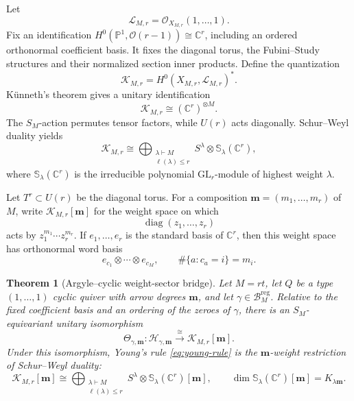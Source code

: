 \documentclass[11pt]{article}
\newtheorem{theorem}{Theorem}[section]
\theoremstyle{definition}
\theoremstyle{remark}
\newcommand{\C}{\mathbb C}
\newcommand{\Pp}{\mathbb P}
\newcommand{\cH}{\mathcal H}
\newcommand{\cK}{\mathcal K}
\newcommand{\cB}{\mathcal B}
\newcommand{\cO}{\mathcal O}
\newcommand{\diag}{\operatorname{diag}}
\newcommand{\reg}{\mathrm{reg}}
\begin{document}
Let
\begin{equation}\label{eq:master-polarization}
 \mathscr L_{M,r}=\cO_{X_{M,r}}(1,\ldots,1).
\end{equation}
Fix an identification $H^0(\Pp^1,\cO(r-1))\cong\C^r$, including an ordered orthonormal coefficient basis.  It fixes the diagonal torus, the Fubini--Study structures and their normalized section inner products.  Define the quantization
\begin{equation}\label{eq:master-Hilbert}
 \cK_{M,r}=H^0(X_{M,r},\mathscr L_{M,r})^*.
\end{equation}
K\"unneth's theorem gives a unitary identification
\begin{equation}\label{eq:master-tensor}
 \cK_{M,r}\cong(\C^r)^{\otimes M}.
\end{equation}
The $S_M$-action permutes tensor factors, while $U(r)$ acts diagonally.  Schur--Weyl duality \cite{FultonHarris1991} yields
\begin{equation}\label{eq:schur-weyl}
 \cK_{M,r}
 \cong
 \bigoplus_{\substack{\lambda\vdash M\\\ell(\lambda)\leq r}}
 S^\lambda\otimes \mathbb S_\lambda(\C^r),
\end{equation}
where $\mathbb S_\lambda(\C^r)$ is the irreducible polynomial $\mathrm{GL}_r$-module of highest weight $\lambda$.

Let $T^r\subset U(r)$ be the diagonal torus.  For a composition $\boldsymbol m=(m_1,\ldots,m_r)$ of $M$, write $\cK_{M,r}[\boldsymbol m]$ for the weight space on which
\[
 \diag(z_1,\ldots,z_r)
\]
acts by $z_1^{m_1}\cdots z_r^{m_r}$.  If $e_1,\ldots,e_r$ is the standard basis of $\C^r$, then this weight space has orthonormal word basis
\begin{equation}\label{eq:word-basis}
 e_{c_1}\otimes\cdots\otimes e_{c_M},
 \qquad
 \#\{a:c_a=i\}=m_i.
\end{equation}

\begin{theorem}[Argyle--cyclic weight-sector bridge]\label{thm:argyle-cyclic-bridge}
Let $M=rt$, let $Q$ be a type $(1,\ldots,1)$ cyclic quiver with arrow degrees $\boldsymbol m$, and let $\gamma\in\cB_M^{\reg}$.  Relative to the fixed coefficient basis and an ordering of the zeroes of $\gamma$, there is an $S_M$-equivariant unitary isomorphism
\begin{equation}\label{eq:bridge-isomorphism}
 \Theta_{\gamma,\boldsymbol m}:
 \cH_{\gamma,\boldsymbol m}
 \xrightarrow{\ \cong\ }
 \cK_{M,r}[\boldsymbol m].
\end{equation}
Under this isomorphism, Young's rule \eqref{eq:young-rule} is the $\boldsymbol m$-weight restriction of Schur--Weyl duality:
\begin{equation}\label{eq:weight-schur-weyl}
 \cK_{M,r}[\boldsymbol m]
 \cong
 \bigoplus_{\substack{\lambda\vdash M\\\ell(\lambda)\leq r}}
 S^\lambda\otimes\mathbb S_\lambda(\C^r)[\boldsymbol m],
 \qquad
 \dim\mathbb S_\lambda(\C^r)[\boldsymbol m]
 =K_{\lambda\boldsymbol m}.
\end{equation}
\end{theorem}
\end{document}
